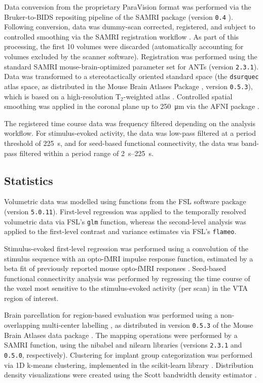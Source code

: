 Data conversion from the proprietary ParaVision format was performed via the Bruker-to-BIDS repositing pipeline \cite{aowsis} of the SAMRI package (version \textcolor{mg}{\texttt{0.4}} \cite{samri}).
Following conversion, data was dummy-scan corrected, registered, and subject to controlled smoothing via the SAMRI registration workflow \cite{irsabi}.
As part of this processing, the first 10 volumes were discarded (automatically accounting for volumes excluded by the scanner software).
Registration was performed using the standard SAMRI mouse-brain-optimized parameter set for ANTs \cite{ants} (version \textcolor{mg}{\texttt{2.3.1}}).
Data was transformed to a stereotactically oriented standard space (the \textcolor{mg}{\texttt{dsurquec}} atlas space, as distributed in the Mouse Brain Atlases Package \cite{atlases_generator}, version \textcolor{mg}{\texttt{0.5.3}}), which is based on a high-resolution $\mathrm{T_2}$-weighted atlas \cite{dsu1}.
Controlled spatial smoothing was applied in the coronal plane up to \SI{250}{\micro\meter} via the AFNI package \cite{afni}.

The registered time course data was frequency filtered depending on the analysis workflow.
For stimulus-evoked activity, the data was low-pass filtered at a period threshold of \SI{225}{\second}, and for seed-based functional connectivity, the data was band-pass filtered within a period range of \SIrange{2}{225}{\second}.

\subsection{Statistics}
Volumetric data was modelled using functions from the FSL software package \cite{fsl} (version \textcolor{mg}{\texttt{5.0.11}}).
First-level regression was applied to the temporally resolved volumetric data via FSL's \textcolor{mg}{\texttt{glm}} function, whereas the second-level analysis was applied to the first-level contrast and variance estimates via FSL's \textcolor{mg}{\texttt{flameo}}.

Stimulus-evoked first-level regression was performed using a convolution of the stimulus sequence with an opto-fMRI impulse response function, estimated by a beta fit of previously reported mouse opto-fMRI responses \cite{Grandjean2019}.
Seed-based functional connectivity analysis was performed by regressing the time course of the voxel most sensitive to the stimulus-evoked activity (per scan) in the VTA region of interest.

Brain parcellation for region-based evaluation was performed using a non-overlapping multi-center labelling \cite{dsu1,dsu2,dsu3,dsu4}, as distributed in version \textcolor{mg}{\texttt{0.5.3}} of the Mouse Brain Atlases data package \cite{atlases_generator}.
The mapping operations were performed by a SAMRI function, using the nibabel \cite{nibabel} and nilearn \cite{nilearn} libraries (versions \textcolor{mg}{\texttt{2.3.1}} and \textcolor{mg}{\texttt{0.5.0}}, respectively).
Clustering for implant group categorization was performed via 1D k-means clustering, implemented in the scikit-learn library \cite{scikit-learn}.
Distribution density visualizations were created using the Scott bandwidth density estimator \cite{Scott1979}.

